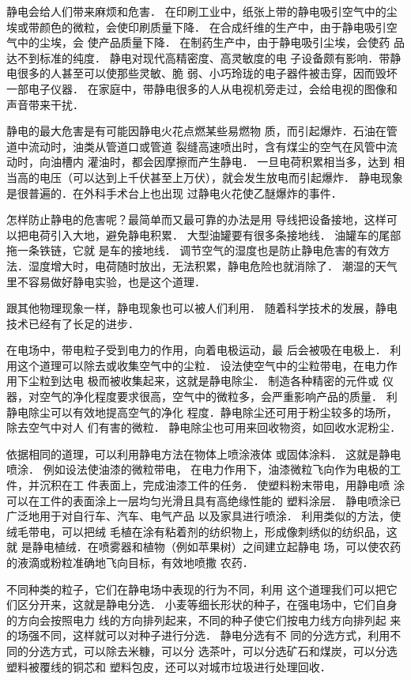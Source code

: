 静电会给人们带来麻烦和危害．
在印刷工业中，纸张上带的静电吸引空气中的尘埃或带颜色的微粒，会使印刷质量下降．
在合成纤维的生产中，由于静电吸引空气中的尘埃，会
使产品质量下降．
在制药生产中，由于静电吸引尘埃，会使药
品达不到标准的纯度．
静电对现代高精密度、高灵敏度的电
子设备颇有影响．带静电很多的人甚至可以使那些灵敏、脆
弱、小巧玲珑的电子器件被击穿，因而毁坏一部电子仪器．
在家庭中，带静电很多的人从电视机旁走过，会给电视的图像和
声音带来干扰．

静电的最大危害是有可能因静电火花点燃某些易燃物
质，而引起爆炸．石油在管道中流动时，油类从管道口或管道
裂缝高速喷出时，含有煤尘的空气在风管中流动时，向油槽内
灌油时，都会因摩擦而产生静电．
一旦电荷积累相当多，达到
相当高的电压（可以达到上千伏甚至上万伏），就会发生放电而引起爆炸．
静电现象是很普遍的．在外科手术台上也出现
过静电火花使乙醚爆炸的事件．

怎样防止静电的危害呢？最简单而又最可靠的办法是用
导线把设备接地，这样可以把电荷引入大地，避免静电积累．
大型油罐要有很多条接地线．
油罐车的尾部拖一条铁链，它就
是车的接地线．
调节空气的湿度也是防止静电危害的有效方
法．湿度增大时，电荷随时放出，无法积累，静电危险也就消除了．
潮湿的天气里不容易做好静电实验，也是这个道理．

跟其他物理现象一样，静电现象也可以被人们利用．
随着科学技术的发展，静电技术已经有了长足的进步．

在电场中，带电粒子受到电力的作用，向着电极运动，最
后会被吸在电极上．
利用这个道理可以除去或收集空气中的尘粒．
设法使空气中的尘粒带电，在电力作用下尘粒到达电
极而被收集起来，这就是静电除尘．
制造各种精密的元件或
仪器，对空气的净化程度要求很高，空气中的微粒多，会严重影响产品的质量．
利静电除尘可以有效地提高空气的净化
程度．静电除尘还可用于粉尘较多的场所，除去空气中对人
们有害的微粒．
静电除尘也可用来回收物资，如回收水泥粉尘．

依据相同的道理，可以利用静电方法在物体上喷涂液体
或固体涂料．
这就是静电喷涂．
例如设法使油漆的微粒带电，
在电力作用下，油漆微粒飞向作为电极的工件，并沉积在工
件表面上，完成油漆工件的任务．
使塑料粉末带电，用静电喷
涂可以在工件的表面涂上一层均匀光滑且具有高绝缘性能的
塑料涂层．
静电喷涂已广泛地用于对自行车、汽车、电气产品
以及家具进行喷涂．
利用类似的方法，使绒毛带电，可以把绒
毛植在涂有粘着剂的纺织物上，形成像刺绣似的纺织品，这就
是静电植绒．在喷雾器和植物（例如苹果树）之间建立起静电
场，可以使农药的液滴或粉粒准确地飞向目标，有效地喷撒
农药．

不同种类的粒子，它们在静电场中表现的行为不同，利用
这个道理我们可以把它们区分开来，这就是静电分选．
小麦等细长形状的种子，在强电场中，它们自身的方向会按照电力
线的方向排列起来，不同的种子使它们按电力线方向排列起
来的场强不同，这样就可以对种子进行分选．
静电分选有不
同的分选方式，利用不同的分选方式，可以除去米糠，可以分
选茶叶，可以分选矿石和煤炭，可以分选塑料被覆线的铜芯和
塑料包皮，还可以对城市垃圾进行处理回收．

